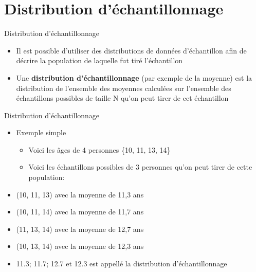 \documentclass[
  ignorenonframetext,
]{beamer}
\providecommand{\tightlist}{%
  \setlength{\itemsep}{0pt}\setlength{\parskip}{0pt}}
\begin{document}
\hypertarget{distribution-duxe9chantillonnage}{%
\section{Distribution
d'échantillonnage}\label{distribution-duxe9chantillonnage}}

\begin{frame}{Distribution d'échantillonnage}
\protect\hypertarget{distribution-duxe9chantillonnage-1}{}
\begin{itemize}
\item
  Il est possible d'utiliser des distributions de données d'échantillon
  afin de décrire la population de laquelle fut tiré l'échantillon
\item
  Une \textbf{distribution d'échantillonnage} (par exemple de la
  moyenne) est la distribution de l'ensemble des moyennes calculées sur
  l'ensemble des échantillons possibles de taille N qu'on peut tirer de
  cet échantillon
\end{itemize}
\end{frame}

\begin{frame}{Distribution d'échantillonnage}
\protect\hypertarget{distribution-duxe9chantillonnage-2}{}
\begin{itemize}
\item
  Exemple simple

  \begin{itemize}
  \tightlist
  \item
    Voici les âges de 4 personnes \{10, 11, 13, 14\}
  \item
    Voici les échantillons possibles de 3 personnes qu'on peut tirer de
    cette population:
  \end{itemize}
\end{itemize}

\begin{itemize}[<+->]
\tightlist
\item
  (10, 11, 13) avec la moyenne de 11,3 ans
\item
  (10, 11, 14) avec la moyenne de 11,7 ans
\item
  (11, 13, 14) avec la moyenne de 12,7 ans
\item
  (10, 13, 14) avec la moyenne de 12,3 ans
\end{itemize}

\begin{itemize}[<+->]
\tightlist
\item
  11.3; 11.7; 12.7 et 12.3 est appellé la distribution d'échantillonnage
\end{itemize}
\end{frame}
\end{document}
